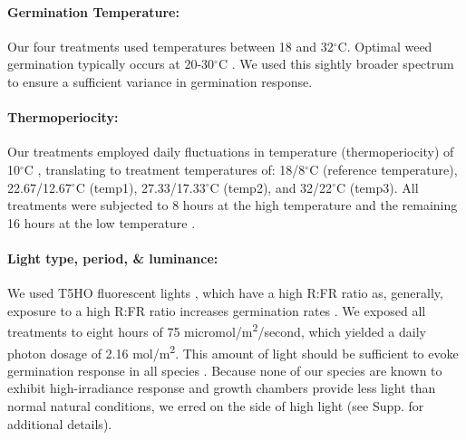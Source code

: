 \documentclass[12pt]{article}\usepackage[]{graphicx}\usepackage[]{color}
\begin{document}
	\paragraph{Germination Temperature:} Our four treatments used temperatures between 18 and 32$^\circ$C. Optimal weed germination typically occurs at 20-30$^\circ$C \parencite{Hartmann2010,Steinbauer1957,Wulff1994,Popay1970}. We used this  sightly broader spectrum to ensure a sufficient variance in germination response.
	
	\paragraph{Thermoperiocity:} Our treatments employed daily fluctuations in temperature (thermoperiocity) of 10$^\circ$C \parencite[see e.g.,][]{Steinbauer1957, Toole1963,ISTA1954}, translating to treatment temperatures of: 18/8$^\circ$C (reference temperature), 22.67/12.67$^\circ$C (temp1), 27.33/17.33$^\circ$C (temp2), and 32/22$^\circ$C (temp3). All treatments were subjected to 8 hours at the high temperature and the remaining 16 hours at the low temperature \parencite{Baskin1998,Roberts1981,Popay1970,Probert2000}. %

	\paragraph{Light type, period, \& luminance:} We used T5HO fluorescent lights \parencite{Toole1963}, which have a high R:FR ratio as, generally, exposure to a high R:FR ratio increases germination rates \parencite[though some studies find germination requires high R:FR ratio or is insensitive,][]{Popay1970,Pons2000,Wulff1994}. %
We exposed all treatments to eight hours \parencite[coinciding with the higher temperature,][]{Baskin1998} of 75 micromol/m\textsuperscript{2}/second, which yielded a daily photon dosage of 2.16 mol/m\textsuperscript{2}. This amount of light should be sufficient to evoke germination response in all species \parencite{Pons1991}. Because none of our species are known to exhibit high-irradiance response and  growth chambers provide less light than normal natural conditions, we erred on the side of high light (see Supp. for additional details). 
	
\end{document}
